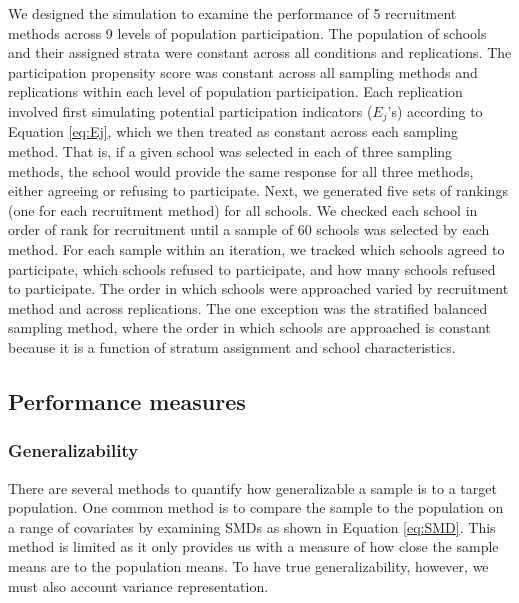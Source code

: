 \documentclass[english,man,floatsintext]{apa6}
\begin{document}
We designed the simulation to examine the performance of 5 recruitment methods across 9 levels of population participation. The population of schools and their assigned strata were constant across all conditions and replications. The participation propensity score was constant across all sampling methods and replications within each level of population participation. Each replication involved first simulating potential participation indicators (\(E_j\)'s) according to Equation \eqref{eq:Ej}, which we then treated as constant across each sampling method. That is, if a given school was selected in each of three sampling methods, the school would provide the same response for all three methods, either agreeing or refusing to participate. Next, we generated five sets of rankings (one for each recruitment method) for all schools.
We checked each school in order of rank for recruitment until a sample of 60 schools was selected by each method. For each sample within an iteration, we tracked which schools agreed to participate, which schools refused to participate, and how many schools refused to participate.
The order in which schools were approached varied by recruitment method and across replications. The one exception was the stratified balanced sampling method, where the order in which schools are approached is constant because it is a function of stratum assignment and school characteristics.

\hypertarget{performance-measures}{%
\subsection{Performance measures}\label{performance-measures}}

\hypertarget{generalizability}{%
\subsubsection{Generalizability}\label{generalizability}}

There are several methods to quantify how generalizable a sample is to a target population. One common method is to compare the sample to the population on a range of covariates by examining SMDs as shown in Equation \eqref{eq:SMD}. This method is limited as it only provides us with a measure of how close the sample means are to the population means.
To have true generalizability, however, we must also account variance representation.  
\end{document}
